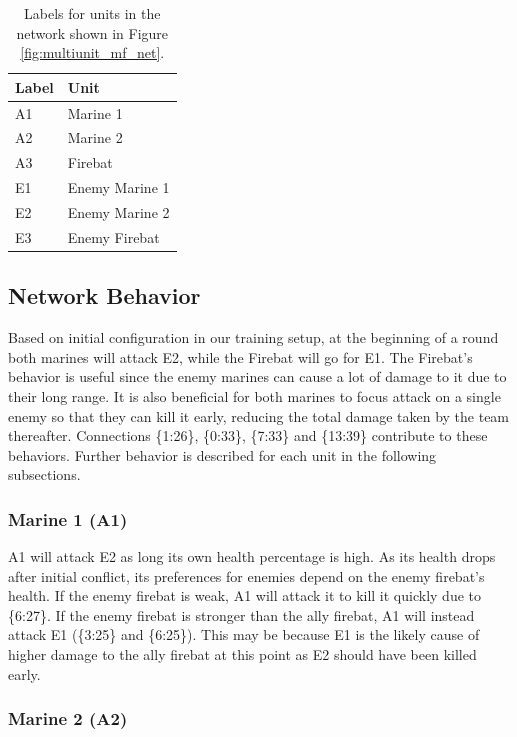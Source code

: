 \documentclass[10pt,a4paper,twocolumn]{article}
\begin{document}
\begin{table}
\centering
\begin{tabular}{|l|l|}
	\hline
	{\bf Label} & {\bf Unit} \\ \hline
	A1 & Marine 1 \\ \hline
	A2 & Marine 2 \\ \hline
	A3 & Firebat \\ \hline
	E1 & Enemy Marine 1 \\ \hline
	E2 & Enemy Marine 2 \\ \hline
	E3 & Enemy Firebat \\ \hline
\end{tabular}
\caption{Labels for units in the network shown in Figure \ref{fig:multiunit_mf_net}.}
\label{tab:multiunit_labels}
\end{table}

\subsection{Network Behavior}
\label{sec:network_behavior}

Based on initial configuration in our training setup, at the beginning of a round both marines will attack E2, while the Firebat will go for E1. The Firebat's behavior is useful since the enemy marines can cause a lot of damage to it due to their long range. It is also beneficial for both marines to focus attack on a single enemy so that they can kill it early, reducing the total damage taken by the team thereafter. Connections \{1:26\}, \{0:33\}, \{7:33\} and \{13:39\} contribute to these behaviors. Further behavior is described for each unit in the following subsections.

\subsubsection{Marine 1 (A1)}
\label{sec:network_out_a1}

A1 will attack E2 as long its own health percentage is high. As its health drops after initial conflict, its preferences for enemies depend on the enemy firebat's health. If the enemy firebat is weak, A1 will attack it to kill it quickly due to \{6:27\}. If the enemy firebat is stronger than the ally firebat, A1 will instead attack E1 (\{3:25\} and \{6:25\}). This may be because E1 is the likely cause of higher damage to the ally firebat at this point as E2 should have been killed early.

\subsubsection{Marine 2 (A2)}
\label{sec:network_out_a1}
\end{document}
